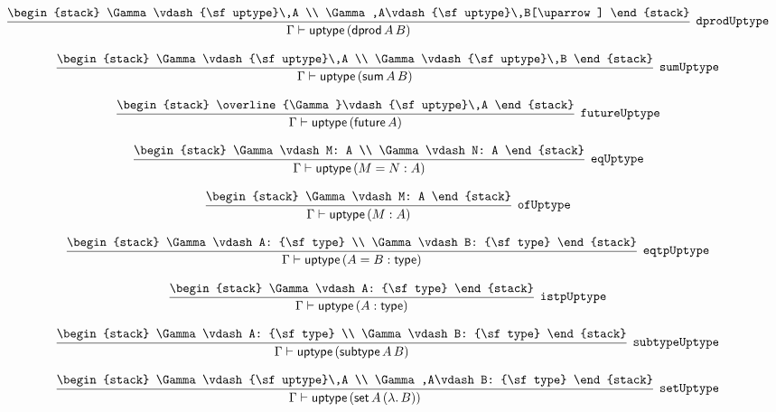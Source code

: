 \[
\infer[{\tt dprodUptype}]{\Gamma \vdash {\sf uptype}\,({\sf dprod}\,A\,B)}{
\begin{stack}
\Gamma \vdash {\sf uptype}\,A
\\
\Gamma ,A\vdash {\sf uptype}\,B[\uparrow ]
\end{stack}}
\]

\[
\infer[{\tt sumUptype}]{\Gamma \vdash {\sf uptype}\,({\sf sum}\,A\,B)}{
\begin{stack}
\Gamma \vdash {\sf uptype}\,A
\\
\Gamma \vdash {\sf uptype}\,B
\end{stack}}
\]

\[
\infer[{\tt futureUptype}]{\Gamma \vdash {\sf uptype}\,({\sf future}\,A)}{
\begin{stack}
\overline{\Gamma}\vdash {\sf uptype}\,A
\end{stack}}
\]

\[
\infer[{\tt eqUptype}]{\Gamma \vdash {\sf uptype}\,(M= N: A)}{
\begin{stack}
\Gamma \vdash M: A
\\
\Gamma \vdash N: A
\end{stack}}
\]

\[
\infer[{\tt ofUptype}]{\Gamma \vdash {\sf uptype}\,(M: A)}{
\begin{stack}
\Gamma \vdash M: A
\end{stack}}
\]

\[
\infer[{\tt eqtpUptype}]{\Gamma \vdash {\sf uptype}\,(A= B: {\sf type})}{
\begin{stack}
\Gamma \vdash A: {\sf type}
\\
\Gamma \vdash B: {\sf type}
\end{stack}}
\]

\[
\infer[{\tt istpUptype}]{\Gamma \vdash {\sf uptype}\,(A: {\sf type})}{
\begin{stack}
\Gamma \vdash A: {\sf type}
\end{stack}}
\]

\[
\infer[{\tt subtypeUptype}]{\Gamma \vdash {\sf uptype}\,({\sf subtype}\,A\,B)}{
\begin{stack}
\Gamma \vdash A: {\sf type}
\\
\Gamma \vdash B: {\sf type}
\end{stack}}
\]

\[
\infer[{\tt setUptype}]{\Gamma \vdash {\sf uptype}\,({\sf set}\,A\,(\lambda .\,B))}{
\begin{stack}
\Gamma \vdash {\sf uptype}\,A
\\
\Gamma ,A\vdash B: {\sf type}
\end{stack}}
\]

